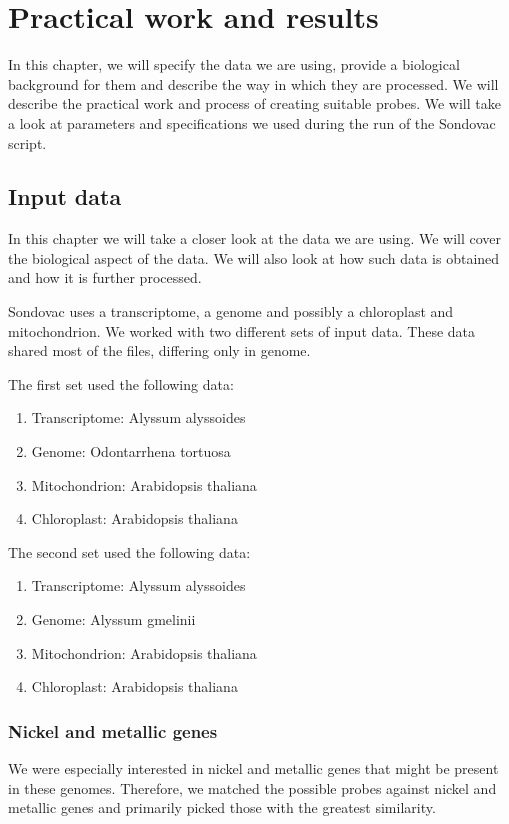 \chapter[Practical work and results]{Practical work and results}
\label{kap:practical_work}

In this chapter,  we will specify the data we are using, provide a biological background for them and describe the way in which they are processed. 
We will describe the practical work and process of creating suitable probes. We will take a look at parameters and specifications we used during the 
run of the Sondovac script. 

\section{Input data}
In this chapter we will take a closer look at the data we are using. We will cover the biological aspect of 
the data. %
We will also look at how such data is obtained and how it is further processed. 

Sondovac uses a transcriptome, a genome and possibly a chloroplast and mitochondrion. 
We worked with two different sets of input data. These data shared most of the files, differing only in genome. 

The first set used the following data: 

\begin{enumerate}
\item Transcriptome: Alyssum alyssoides
\item Genome: Odontarrhena tortuosa
\item Mitochondrion: Arabidopsis thaliana
\item Chloroplast: Arabidopsis thaliana
\end{enumerate}

The second set used the following data: 

\begin{enumerate}
\item Transcriptome: Alyssum alyssoides
\item Genome: Alyssum gmelinii
\item Mitochondrion: Arabidopsis thaliana
\item Chloroplast: Arabidopsis thaliana
\end{enumerate}

\subsection{Nickel and metallic genes}
We were especially interested in nickel and metallic genes that might be present in these genomes. Therefore, we matched the possible 
probes against nickel and metallic genes and primarily picked those with the greatest similarity. 

